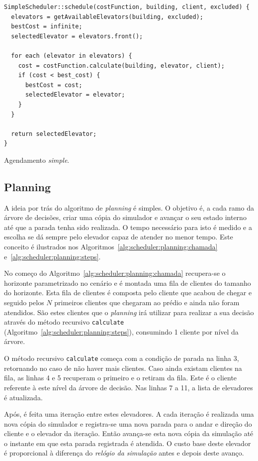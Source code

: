\begin{algorithm}[htb!]
  \centering
  \begin{verbatim}
SimpleScheduler::schedule(costFunction, building, client, excluded) {
  elevators = getAvailableElevators(building, excluded);
  bestCost = infinite;
  selectedElevator = elevators.front();

  for each (elevator in elevators) {
    cost = costFunction.calculate(building, elevator, client);
    if (cost < best_cost) {
      bestCost = cost;
      selectedElevator = elevator;
    }
  }

  return selectedElevator;
}
  \end{verbatim}
  \caption{Agendamento \textit{simple}.}
  \label{alg:scheduler:simple}
\end{algorithm}

\subsection{\label{model:schedulers:planning}Planning}

A ideia por trás do algoritmo de \textit{planning} é simples. O objetivo é, a
cada ramo da árvore de decisões, criar uma cópia do simulador e avançar o seu
estado interno até que a parada tenha sido realizada. O tempo necessário para
isto é medido e a escolha se dá sempre pelo elevador capaz de atender no menor
tempo. Este conceito é ilustrados nos
Algoritmos~\ref{alg:scheduler:planning:chamada}~
e~\ref{alg:scheduler:planning:steps}.

No começo do Algoritmo~\ref{alg:scheduler:planning:chamada} recupera-se o
horizonte parametrizado no cenário e é montada uma fila de clientes do tamanho
do horizonte. Esta fila de clientes é composta pelo cliente que acabou de chegar
e seguido pelos $N$ primeiros clientes que chegaram ao prédio e ainda não foram
atendidos. São estes clientes que o \textit{planning} irá utilizar para realizar
a sua decisão através do método recursivo \texttt{calculate}
(Algoritmo~\ref{alg:scheduler:planning:steps}), consumindo 1 cliente por nível
da árvore.

O método recursivo \texttt{calculate} começa com a condição de parada na linha
3, retornando no caso de não haver mais clientes. Caso ainda existam clientes na
fila, as linhas 4 e 5 recuperam o primeiro e o retiram da fila. Este é o cliente
referente à este nível da árvore de decisão. Nas linhas 7 a 11, a lista de
elevadores é atualizada.

Após, é feita uma iteração entre estes elevadores. A cada iteração é realizada
uma nova cópia do simulador e registra-se uma nova parada para o andar e direção
do cliente e o elevador da iteração. Então avança-se esta nova cópia da
simulação até o instante em que esta parada registrada é atendida. O custo base
deste elevador é proporcional à diferença do \textit{relógio da simulação} antes
e depois deste avanço.

